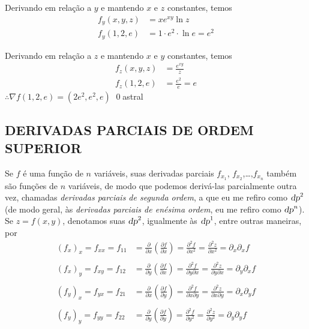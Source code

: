 \documentclass[a4paper, 12pt]{extreport}
\begin{document}
        \flushleft Derivando em relação a $y$ e mantendo $x$ e $z$ constantes, temos
        \begin{equation*}
          \begin{split}
            f_y(x,y,z) & = xe^{xy}\ln{z} \\
            f_y(1,2,e) & = 1 \cdot e^2 \cdot \ln{e} = e^2
          \end{split}
        \end{equation*}

        \flushleft Derivando em relação a $z$ e mantendo $x$ e $y$ constantes, temos
        \begin{equation*}
          \begin{split}
            f_z(x,y,z) & = \frac{e^{xy}}{z} \\
            f_z(1,2,e) & = \frac{e^2}{e} = e
          \end{split}
        \end{equation*}
        $\therefore \nabla f(1,2,e) = (2e^2, e^2, e)$
        \qed{astral}

    \subsection*{\color{coverup}\small DERIVADAS PARCIAIS DE ORDEM SUPERIOR}
      \justifying Se $f$ é uma função de $n$ variáveis, suas derivadas parciais $f_{x_1}$, $f_{x_2}$,\dots,$f_{x_n}$ também são funções de $n$ variáveis, de modo
      que podemos derivá-las parcialmente outra vez, chamadas \textsl{derivadas parciais de segunda ordem}, a que eu me refiro como $\textsl{dp}^2$
      (de modo geral, às \textsl{derivadas parciais de enésima ordem}, eu me refiro como $\textsl{dp}^n$). Se $z=f(x,y)$, denotamos suas $\textsl{dp}^2$, igualmente
      às $\textsl{dp}^1$, entre outras maneiras, por
      \begin{equation*}
        \begin{split}
          (f_x)_x = f_{xx} = f_{11} & = \frac{\partial}{\partial x}\left(\frac{\partial f}{\partial x}\right) = \frac{\partial^2f}{\partial x^2} = \frac{\partial^2z}{\partial x^2} = \partial_x\partial_xf \\
          \\
          (f_x)_y = f_{xy} = f_{12} & = \frac{\partial}{\partial y}\left(\frac{\partial f}{\partial x}\right) = \frac{\partial^2f}{\partial y\partial x} = \frac{\partial^2z}{\partial y\partial x} = \partial_y\partial_xf \\
          \\
          (f_y)_x = f_{yx} = f_{21} & = \frac{\partial}{\partial x}\left(\frac{\partial f}{\partial y}\right) = \frac{\partial^2f}{\partial x\partial y} = \frac{\partial^2z}{\partial x\partial y} = \partial_x\partial_yf \\
          \\
          (f_y)_y = f_{yy} = f_{22} & = \frac{\partial}{\partial y}\left(\frac{\partial f}{\partial y}\right) = \frac{\partial^2f}{\partial y^2} = \frac{\partial^2z}{\partial y^2} = \partial_y\partial_yf
        \end{split}
      \end{equation*}
\end{document}
